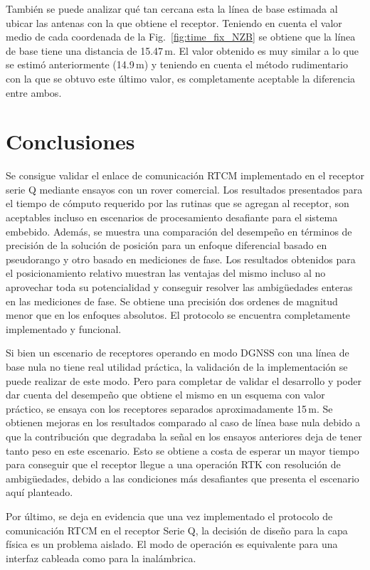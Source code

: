 \documentclass[a4paper,12pt,oneside,onecolumn,final,openright]{book}%
\begin{document}
	También se puede analizar qué tan cercana esta la línea de base estimada al ubicar las antenas con la que obtiene el receptor. Teniendo en cuenta el valor medio de cada coordenada de la Fig.~\ref{fig:time_fix_NZB} se obtiene que la línea de base tiene una distancia de 15.47\,m. El valor obtenido es muy similar a lo que se estimó anteriormente (14.9\,m) y teniendo en cuenta el método rudimentario con la que se obtuvo este último valor, es completamente aceptable la diferencia entre ambos.
\section{Conclusiones}
	Se consigue validar el enlace de comunicación RTCM implementado en el receptor serie Q mediante ensayos con un rover comercial. Los resultados presentados para el tiempo de cómputo requerido por las rutinas que se agregan al receptor, son aceptables incluso en escenarios de procesamiento desafiante para el sistema embebido. Además, se muestra una comparación del desempeño en términos de precisión de la solución de posición para un enfoque diferencial basado en pseudorango y otro basado en mediciones de fase. Los resultados obtenidos para el posicionamiento relativo muestran las ventajas del mismo incluso al no aprovechar toda su potencialidad y conseguir resolver las ambigüedades enteras en las mediciones de fase. Se obtiene una precisión dos ordenes de magnitud menor que en los enfoques absolutos. El protocolo se encuentra completamente implementado y funcional.
	
	Si bien un escenario de receptores operando en modo DGNSS con una línea de base nula no tiene real utilidad práctica, la validación de la implementación se puede realizar de este modo. Pero para completar de validar el desarrollo y poder dar cuenta del desempeño que obtiene el mismo en un esquema con valor práctico, se ensaya con los receptores separados aproximadamente 15\,m. Se obtienen mejoras en los resultados comparado al caso de línea base nula debido a que la contribución que degradaba la señal en los ensayos anteriores deja de tener tanto peso en este escenario. Esto se obtiene a costa de esperar un mayor tiempo para conseguir que el receptor llegue a una operación RTK con resolución de ambigüedades, debido a las condiciones más desafiantes que presenta el escenario aquí planteado.
	
	Por último, se deja en evidencia que una vez implementado el protocolo de comunicación RTCM en el receptor Serie Q, la decisión de diseño para la capa física es un problema aislado. El modo de operación es equivalente para una interfaz cableada como para la inalámbrica.
	
\end{document}
